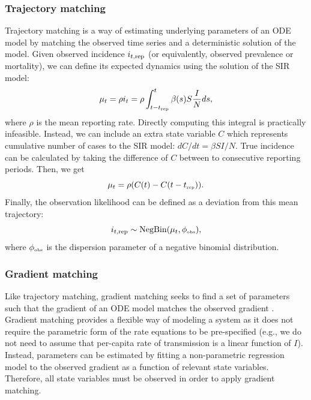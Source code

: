 \documentclass{article}
\newcommand{\tsub}[2]{#1_{{\textrm{\tiny #2}}}}
\begin{document}
\subsubsection*{Trajectory matching}

Trajectory matching is a way of estimating underlying parameters of an ODE model by matching the observed time series and a deterministic solution of the model.
Given observed incidence $i_{t, {\tiny \textrm{rep}}}$ (or equivalently, observed prevalence or mortality), we can define its expected dynamics using the solution of the SIR model:
\begin{equation}
\mu_t = \rho i_t = \rho \int_{t-\tsub{t}{rep}}^{t} \beta(s) S \frac{I}{N} ds,
\end{equation}
where $\rho$ is the mean reporting rate.
Directly computing this integral is practically infeasible. 
Instead, we can include an extra state variable $C$ which represents cumulative number of cases to the SIR model: $dC/dt = \beta SI/N$.
True incidence can be calculated by taking the difference of $C$ between to consecutive reporting periods.
Then, we get
\begin{equation}
\mu_t = \rho (C(t) - C(t-\tsub{t}{rep})).
\end{equation}
Finally, the observation likelihood can be defined as a deviation from this mean trajectory:
\begin{equation}
i_{t, {\tiny \textrm{rep}}} \sim \mathrm{NegBin}(\mu_t, \tsub{\phi}{obs}),
\end{equation}
where $\tsub{\phi}{obs}$ is the dispersion parameter of a negative binomial distribution.

\subsubsection*{Gradient matching}

Like trajectory matching, gradient matching seeks to find a set of parameters such that the gradient of an ODE model matches the observed gradient \citep{ellner2002fitting}.
Gradient matching provides a flexible way of modeling a system as it does not require the parametric form of the rate equations to be pre-specified (e.g., we do not need to assume that per-capita rate of transmission is a linear function of $I$).
Instead, parameters can be estimated by fitting a non-parametric regression model to the observed gradient as a function of relevant state variables.
Therefore, all state variables must be observed in order to apply gradient matching.
\end{document}
